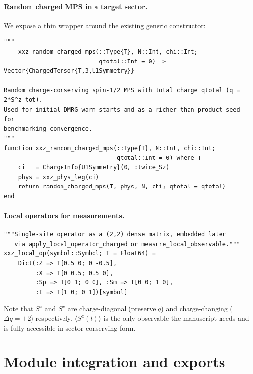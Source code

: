\documentclass[11pt]{article}
\begin{document}
\paragraph{Random charged MPS in a target sector.}
We expose a thin wrapper around the existing generic constructor:
\begin{lstlisting}
"""
    xxz_random_charged_mps(::Type{T}, N::Int, chi::Int;
                           qtotal::Int = 0) -> Vector{ChargedTensor{T,3,U1Symmetry}}

Random charge-conserving spin-1/2 MPS with total charge qtotal (q = 2*S^z_tot).
Used for initial DMRG warm starts and as a richer-than-product seed for
benchmarking convergence.
"""
function xxz_random_charged_mps(::Type{T}, N::Int, chi::Int;
                                qtotal::Int = 0) where T
    ci   = ChargeInfo{U1Symmetry}(0, :twice_Sz)
    phys = xxz_phys_leg(ci)
    return random_charged_mps(T, phys, N, chi; qtotal = qtotal)
end
\end{lstlisting}

\paragraph{Local operators for measurements.}
\begin{lstlisting}
"""Single-site operator as a (2,2) dense matrix, embedded later
   via apply_local_operator_charged or measure_local_observable."""
xxz_local_op(symbol::Symbol; T = Float64) =
    Dict(:Z => T[0.5 0; 0 -0.5],
         :X => T[0 0.5; 0.5 0],
         :Sp => T[0 1; 0 0], :Sm => T[0 0; 1 0],
         :I => T[1 0; 0 1])[symbol]
\end{lstlisting}
Note that $S^z$ and $S^x$ are charge-diagonal (preserve $q$) and
charge-changing ($\Delta q = \pm 2$) respectively.  $\langle S^z(t)\rangle$
is the only observable the manuscript needs and is fully accessible in
sector-conserving form.

\section{Module integration and exports}
\end{document}
